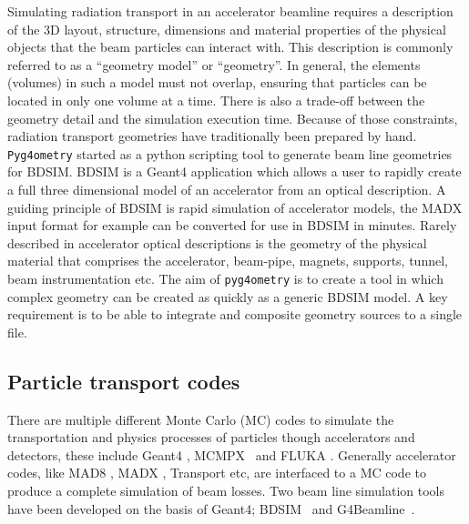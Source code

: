 \documentclass[a4paper,
               keeplastbox,   %
               ]{jacow}
\begin{document}
Simulating radiation transport in an accelerator beamline requires a description of the 3D layout, structure, dimensions and material properties of the physical objects that the beam particles can interact with. This description is commonly referred to as a ``geometry model'' or ``geometry''. In general, the elements (volumes) in such a model must not overlap, ensuring that particles can be located in only one volume at a time. There is also a trade-off between the geometry detail and the simulation execution time. Because of those constraints, radiation transport geometries have traditionally been prepared by hand.\\
\verb|Pyg4ometry| started as a python scripting tool to generate beam line geometries for BDSIM. BDSIM is a Geant4 application which allows a user to rapidly create a full three dimensional model of an accelerator from an optical description. A guiding principle of BDSIM is rapid simulation of accelerator models, the MADX input format for example can be converted for use in BDSIM in minutes. Rarely described in accelerator optical descriptions is the geometry of the physical material that comprises the accelerator, beam-pipe, magnets, supports, tunnel, beam instrumentation etc. The aim of \verb|pyg4ometry| is to create a tool  in which complex geometry can be created as quickly as a generic BDSIM model. A key requirement is to be able to integrate and composite geometry sources to a single file.             
%

\subsection{Particle transport codes}
There are multiple different Monte Carlo (MC) codes to simulate the transportation and physics processes of particles though accelerators and detectors, these include Geant4 \cite{geant4}, MCMPX~\cite{mcnpx} and FLUKA \cite{fluka}. Generally accelerator codes, like MAD8 \cite{mad8}, MADX \cite{madx}, Transport \cite{transport} etc, are interfaced to a MC code to produce a complete simulation of beam losses. Two beam line simulation tools have been developed on the basis of Geant4; BDSIM~\cite{bdsim_arxiv} and G4Beamline~\cite{g4beamline}.     
\end{document}
